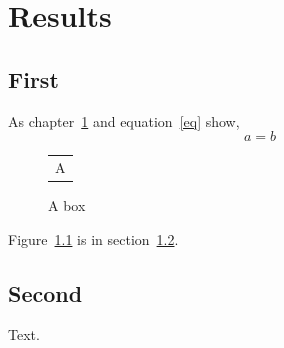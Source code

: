 \documentclass{report}
\begin{document}
\listoffigures
\chapter{Results}\label{res}
\section{First}
As chapter~\ref{res} and equation~\ref{eq} show,
\begin{equation}
a = b \label{eq}
\end{equation}
\begin{figure}[h]
\centering
\begin{tabular}{c}A\end{tabular}
\caption{A box}\label{fig}
\end{figure}
Figure~\ref{fig} is in section~\ref{sec}.
\section{Second}\label{sec}
Text.
\end{document}
